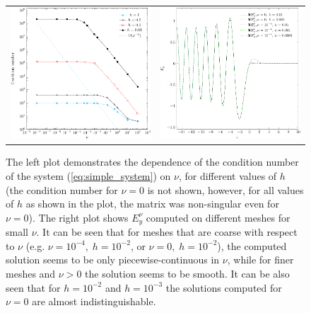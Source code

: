 \begin{figure}[htb!]
\begin{tabular}{cc}
\includegraphics[height=0.32\textwidth]{pics_frequency_domain/fig_cond_num.pdf}&
 \includegraphics[height=0.32\textwidth]{pics_frequency_domain/ey_resonance.pdf}
 \end{tabular}
 \caption{
 The left plot demonstrates the dependence of the condition number of the system (\ref{eq:simple_system}) on $\nu$, for different values of $h$ (the condition 
 number for $\nu=0$ is not shown, however, for all values of $h$ as shown in the plot, the matrix was non-singular even for $\nu=0$). 
 The right plot shows $E_{y}^{\nu}$ computed on different meshes for small $\nu$. It can be seen that for meshes that are coarse 
 with respect to $\nu$ (e.g. $\nu=10^{-4}, \; h=10^{-2}$, or $\nu=0,\; h=10^{-2}$), the computed solution seems to be only piecewise-continuous in $\nu$, 
 while for finer meshes and $\nu>0$ the solution seems to be smooth. It can be also seen that for $h=10^{-2}$ and $h=10^{-3}$ the solutions 
 computed for $\nu=0$ are almost indistinguishable.}
 \label{fig:small_nu}
\end{figure}

